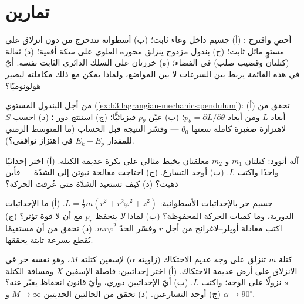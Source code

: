\section{تمارين}

\begin{exercise}[$\star$]\label{exo:b3:lagrangian-mechanics:1}
أحصِ  واقترح : (أ) جسيم داخل وعاء
ثابت؛ (ب) أسطوانة تتدحرج من دون انزلاق على مستوٍ مائل ثابت؛ (ج)
بندول مزدوج ينزلق محوره العلوي على سكة أفقية؛ (د) ثقالة (كتلتان
وقضيب صلب) في الفضاء؛ (ه) خرزتان على السلك الدائري الثابت نفسه.
أيّ  في هذه القائمة يربط بين السرعات لا بين المواضع، ولماذا
يمكن مع ذلك مكاملته ليصير هولونوميًا؟
\end{exercise}

\begin{exercise}[$\star$]\label{exo:b3:lagrangian-mechanics:2}
من أجل البندول المستوي (\cref{ex:b3:lagrangian-mechanics:pendulum}):
(أ) تحقق من أبعاد $L$ ومن أبعاد $p_\theta =
\partial L/\partial\dot\theta$؛ (ب) عيّن $p_\theta$ فيزيائيًّا؛ (ج)
استنتج دور ؛ (د) احسب  $S$ لاهتزازة صغيرة
كاملة سعتها $\theta_0$ --- وفسّر النتيجة قبل الحساب (ما المتوسط
الزمني للمقدار $E_k - E_p$ في اهتزاز توافقي؟).
\end{exercise}

\begin{exercise}[$\star$]\label{exo:b3:lagrangian-mechanics:3}
آلة أتوود: كتلتان $m_1$ و $m_2$ معلقتان بخيط مثالي على بكرة عديمة
الكتلة. (أ) اختر إحداثيًا واحدًا واكتب $L$. (ب) أوجد التسارع. (ج)
احتاجت معالجة نيوتن إلى الشدّة --- فأين ذهبت؟ (د) كيف تستعيد
الشدّة متى عُرفت الحركة؟
\end{exercise}

\begin{exercise}[$\star$]\label{exo:b3:lagrangian-mechanics:4}
جسيم حر بالإحداثيات الأسطوانية: $L = \tfrac12 m(\dot r^2 +
r^2\dot\varphi^2 + \dot z^2)$. (أ) ما الإحداثيات الدورية، وما
كميات الحركة المحفوظة؟ (ب) لماذا \emph{لا} ينحفظ $p_r$ مع أن لا
قوة تؤثر؟ (ج) اكتب معادلة أويلر--لاغرانج من أجل $r$ وفسّر الحدّ
$mr\dot\varphi^2$. (د) تحقق من أن مستقيمًا يُقطع بسرعة ثابتة
يحققها.
\end{exercise}

\begin{exercise}[$\star\star$]\label{exo:b3:lagrangian-mechanics:5}
كتلة $m$ تنزلق على وجه عديم الاحتكاك (زاويته $\alpha$) لإسفين
كتلته $M$، وهو نفسه حر في الانزلاق على أرض عديمة الاحتكاك. (أ)
اختر إحداثيين: فاصلة الإسفين $X$ ومسافة الكتلة $s$ نزولًا على
الوجه؛ واكتب $L$. (ب) أيّ الإحداثيين دوري، وأيّ قانون انحفاظ
يعبّر عنه؟ (ج) أوجد التسارعين. (د) تحقق من الحالتين الحديتين
$M \to \infty$ و $\alpha \to
90^\circ$.
\end{exercise}

